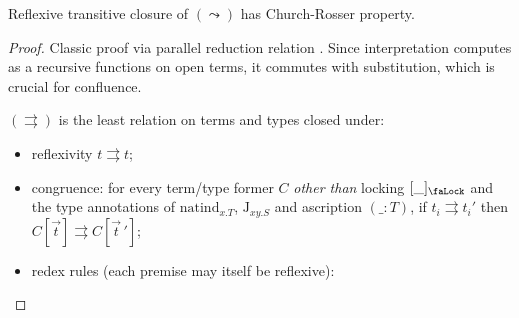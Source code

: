 \begin{theorem}
    Reflexive transitive closure of $(\leadsto)$ has
    Church-Rosser property.
\end{theorem}
\begin{proof}
    Classic proof via parallel reduction relation
    \cite{takahashi1995parallel,barendregt1984lambda}.
    Since interpretation computes as a recursive
    functions on open terms, it commutes with
    substitution, which is crucial for confluence.

    $(\rightrightarrows)$ is the least relation on
    terms and types closed under:
    \begin{itemize}
        \item reflexivity $t \rightrightarrows t$;
        \item congruence: for every term/type former
            $C$ \emph{other than} locking
            $[\_]_\text{\faLock}$ and the type
            annotations of $\mathrm{natind}_{x.T}$,
            $\mathrm J_{xy.S}$ and ascription $(\_:T)$,
            if $t_i \rightrightarrows t_i'$ then
            $C[\vec t]\rightrightarrows C[\vec t\,']$;
        \item redex rules (each premise may itself be
            reflexive):
    \end{itemize}
\end{proof}
